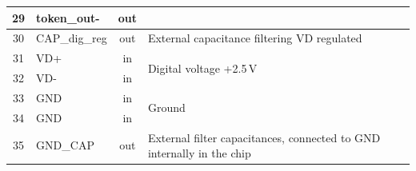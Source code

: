 \begin{table}[h]
\begin{center}
{\begin{tabular}{clcl}
	29 & token\_out-     & out & \\
	\midrule %
	30 & CAP\_dig\_reg   & out & External capacitance filtering VD regulated \\
	\midrule %
	31 & VD+             & in  & \multirow{2}{*}{Digital voltage +2.5\,V} \\
	32 & VD-             & in  & \\
	\midrule %
	33 & GND             & in  & \multirow{2}{*}{Ground}\\
	34 & GND             & in  & \\
	\midrule %
	35 & GND\_CAP        & out & External filter capacitances, connected to GND internally in the chip \\
	\bottomrule %
	\end{tabular}
	}
    \end{center}
\end{table}
